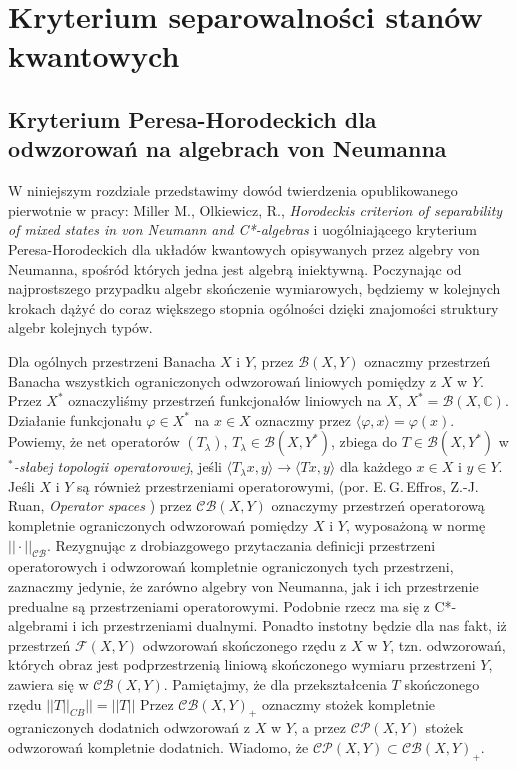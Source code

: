 \chapter{Kryterium separowalności stanów kwantowych}
\label{chp:PHcrit}
\section{Kryterium Peresa-Horodeckich dla odwzorowań na algebrach von Neumanna}
W niniejszym rozdziale przedstawimy dowód twierdzenia
opublikowanego pierwotnie w pracy:
Miller M., Olkiewicz, R.,
\emph{Horodeckis criterion of separability of mixed states in von Neumann and C*-algebras}
\cite{miller2014horodeckis}
i uogólniającego kryterium Peresa-Horodeckich dla układów
kwantowych opisywanych przez algebry von Neumanna,
spośród których jedna jest algebrą iniektywną.
Poczynając od najprostszego przypadku algebr skończenie wymiarowych,
będziemy w kolejnych krokach dążyć do coraz większego stopnia
ogólności dzięki znajomości struktury algebr kolejnych typów.

\vspace{0.5cm}
Dla ogólnych przestrzeni Banacha $X$ i $Y$, przez
$\mathcal{B}(X,Y)$
oznaczmy przestrzeń Banacha wszystkich ograniczonych odwzorowań
liniowych pomiędzy z $X$ w $Y$.
Przez $X^{*}$ oznaczyliśmy przestrzeń funkcjonałów liniowych na $X$,
$X^{*} = \mathcal{B}(X, \mathbb{C})$.
Działanie funkcjonału $\varphi \in X^{*}$ na $x \in X$
oznaczmy przez $\langle  \varphi , x \rangle = \varphi(x)$.
Powiemy, że net operatorów $(T_{\lambda})$,
$T_{\lambda} \in \mathcal{B}(X, Y^{*})$, zbiega do
$T \in \mathcal{B}(X, Y^{*})$ w \emph{$^{*}$-słabej topologii operatorowej}, jeśli
\label{page:weakstaroperatortop}
$\langle T_{\lambda} x, y \rangle \rightarrow \langle Tx, y \rangle$
dla każdego $x \in X$ i $y \in Y$.
Jeśli $X$ i $Y$ są również przestrzeniami operatorowymi,
(por. E.\,G.\,Effros, Z.-J.\,Ruan, \emph{Operator spaces} \cite{Effros2000})
przez $\mathcal{CB}(X,Y)$ oznaczymy przestrzeń operatorową
kompletnie ograniczonych odwzorowań pomiędzy $X$ i $Y$,
wyposażoną w normę
$|| \cdot ||_{\mathcal{CB}}$.
Rezygnując z drobiazgowego przytaczania definicji przestrzeni operatorowych
i odwzorowań kompletnie ograniczonych tych przestrzeni,
zaznaczmy jedynie, że zarówno algebry von Neumanna, jak i
ich przestrzenie predualne są przestrzeniami operatorowymi.
Podobnie rzecz ma się z C*-algebrami i ich przestrzeniami dualnymi.
Ponadto instotny będzie dla nas fakt, iż
przestrzeń $\mathcal{F}(X,Y)$
odwzorowań skończonego rzędu z $X$ w $Y$,
tzn. odwzorowań, których obraz jest podprzestrzenią liniową skończonego wymiaru
przestrzeni $Y$, zawiera się w $\mathcal{CB}(X,Y)$.
Pamiętajmy, że dla przekształcenia $T$ skończonego rzędu
$||T||_{CB}|| = ||T||$
Przez $\mathcal{CB}(X,Y)_{+}$
oznaczmy stożek kompletnie ograniczonych dodatnich odwzorowań
z $X$ w $Y$, a przez $\mathcal{CP}(X,Y)$ stożek odwzorowań kompletnie dodatnich.
Wiadomo, że $\mathcal{CP}(X,Y) \subset \mathcal{CB}(X,Y)_{+}$.

